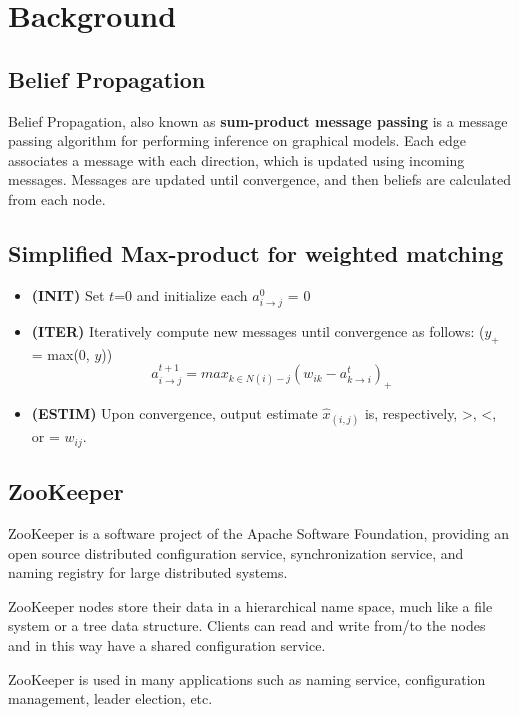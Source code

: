 
\section{Background}

\subsection{Belief Propagation}
Belief Propagation, also known as \textbf{sum-product message passing} is a
message passing algorithm for performing inference on graphical models. 
Each edge associates a message with each direction, which is updated using incoming messages. 
Messages are updated until convergence, and then beliefs are calculated from each node. 
\subsection{Simplified Max-product for weighted matching}
\begin{itemize}
\item


\textbf{(INIT)} Set $t$=0 and initialize each $a_{i \rightarrow j}^0$ = 0
\item
\textbf{(ITER)} Iteratively compute new messages until convergence as follows: ($y_+$ = max(0, $y$))
\begin{displaymath}
a_{i \rightarrow j}^{t+1} = max_{k \in N(i)-j} (w_{ik} - a_{k \rightarrow i}^{t})_+
\end{displaymath}
\item
\textbf{(ESTIM)} Upon convergence, output estimate $\hat{x}_{(i,j)}$ is, respectively, >, <, or = $w_{ij}$.
\end{itemize}

\subsection{ZooKeeper}
ZooKeeper is a software project of the Apache Software Foundation, providing an open source distributed configuration service, synchronization service, and naming registry for large distributed systems. 

ZooKeeper nodes store their data in a hierarchical name space, much like a file system or a tree data structure. Clients can read and write from/to the nodes and in this way have a shared configuration service. 

ZooKeeper is used in many applications such as naming service, configuration management, leader election, etc.


